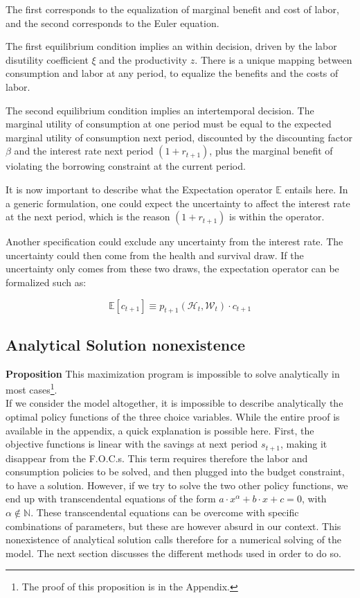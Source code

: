 \documentclass{article}
\begin{document}
The first corresponds to the equalization of marginal benefit and
cost of labor, and the second corresponds to the Euler equation.

The first equilibrium condition implies an within decision,
driven by the labor disutility coefficient $\xi$ and the productivity $z$.
There is a unique mapping between consumption and labor at any period, to 
equalize the benefits and the costs of labor.

The second equilibrium condition implies an intertemporal decision.
The marginal utility of consumption at one period must be equal to the 
expected marginal utility of consumption next period, discounted by 
the discounting factor $\beta$ and the interest rate next period $(1+r_{t+1})$, 
plus the marginal benefit of violating the borrowing constraint at the current period. 

It is now important to describe what the Expectation operator $\mathbb{E}$ entails here. 
In a generic formulation, one could expect the uncertainty to affect the interest rate at the next period, 
which is the reason $(1+r_{t+1})$ is within the operator.

Another specification could exclude any uncertainty from 
the interest rate. 
The uncertainty could then come from the health and survival draw. 
If the uncertainty only comes from these two draws, the expectation operator can be formalized such as: 

$$\mathbb{E}\left[c_{t+1}\right] \equiv p_{t+1}(\mathcal{H}_{t},\mathcal{W}_{t}) \cdot c_{t+1}$$

\subsection{Analytical Solution nonexistence}

\textbf{Proposition}
This maximization program is impossible to solve analytically in most cases\footnote{The proof of this proposition is in the Appendix.}.
\\

If we consider the model altogether, it is impossible to describe 
analytically the optimal policy functions of the three choice variables.
While the entire proof is available in the appendix, a quick explanation
is possible here.
First, the objective functions is linear with the savings at next period $s_{t+1}$, 
making it disappear from the F.O.C.s.
This term requires therefore the labor and consumption policies to be solved, 
and then plugged into the budget constraint, to have a solution. 
However, if we try to solve the two other policy functions, 
we end up with transcendental equations of the form $a\cdot x^{\alpha} + b\cdot x + c = 0$, 
with $\alpha\notin \mathbb{N}$. 
These transcendental equations can be overcome with specific combinations 
of parameters, but these are however absurd in our context.
This nonexistence of analytical solution calls therefore for a numerical solving of the model.
The next section discusses the different methods used in order to do so.
\end{document}

